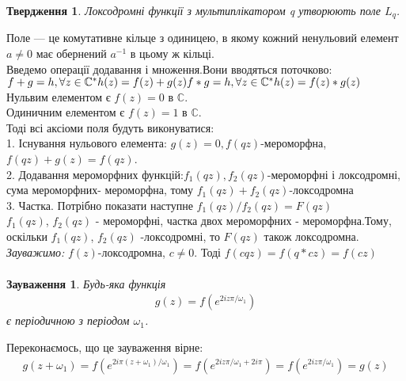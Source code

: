 \documentclass[12pt,a4paper]{article}
\begin{document}
\newtheorem{twerd}{Твердження}
\begin{twerd}
 Локсодромні функції з мультиплікатором \textit{q} утворюють поле $L_{q}$.
 \end{twerd} 
Поле — це комутативне кільце з одиницею, в якому кожний ненульовий елемент $a\neq 0$ має обернений $a^{-1}$ в цьому ж кільці.\\
Введемо операції додавання і множення.Вони вводяться поточково:\\
$f+g=h, \forall z \in \mathbb{C}^{*} h(z)=f(z)+g(z)\\
f*g=h, \forall z \in \mathbb{C}^{*} h(z)=f(z)*g(z)$\\
Нульвим елементом є $f(z)=0$ в $\mathbb{C}$.\\
Одиничним елементом є $f(z)=1$ в $\mathbb{C}$.\\
Тоді всі аксіоми поля будуть виконуватися:\\
1. Існування нульового елемента: $g(z)=0, f(qz)$-мероморфна, $f(qz)+g(z)=f(qz)$.\\
2. Додавання мероморфних функцій:$f_{1}(qz),f_{2}(qz)$-мероморфні і локсодромні, сума мероморфних- мероморфна, тому $f_{1}(qz)+f_{2}(qz)$-локсодромна \\
3. Частка. Потрібно показати наступне $f_{1}(qz)/f_{2}(qz)=F(qz)$\\
$f_{1}(qz)$, $f_{2}(qz)$ - мероморфні, частка двох мероморфних - мероморфна.Тому, оскільки $f_{1}(qz)$, $f_{2}(qz)$ -локсодромні, то $ F(qz)$ також локсодромна.\\
\emph{Зауважимо:} $f(z)$-локсодромна, $c \neq 0$. Тоді  $f(cqz)=f(q*cz)=f(cz)$
\[\begin{array}{l}
\end{array} \]

\newtheorem{zauv}{Зауваження}
\begin{zauv} 
Будь-яка функція 
\begin{equation}\label{eq1}
\begin{array}{l}
g(z)=f(e^{2iz\pi/\omega_{1}})
\end{array}
\end{equation}
є періодичною з періодом $\omega_{1}$.
\end{zauv}
Переконаємось, що це зауваження вірне: 
\[\begin{array}{l}
g(  z+\omega_{1}  ) = f(  e^{  2i\pi (z+\omega_{1})  / \omega_{1}  }  ) =  f(  e^{  2iz\pi / \omega_{1}  +2i\pi } ) = f(  e^{  2iz\pi / \omega_{1}  } ) = g(z) 
\end{array}\]
\[\begin{array}{l}
\end{array} \]
\end{document}
